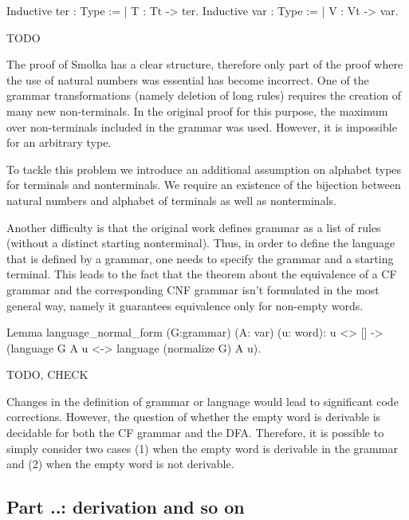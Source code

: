 \begin{listing}[h]
    \begin{pyglist}[language=coq, numbers=none, numbersep=5pt]
  Inductive ter : Type := | T : Tt -> ter.
  Inductive var : Type := | V : Vt -> var.
    \end{pyglist}
    \caption{TODO}
    \label{lst:verbments1}
\end{listing}

The proof of Smolka has a clear structure, therefore only part of the proof where the use of natural numbers was essential has become incorrect. One of the grammar transformations (namely deletion of long rules) requires the creation of many new non-terminals. In the original proof for this purpose, the maximum over non-terminals included in the grammar was used. However, it is impossible for an arbitrary type.

To tackle this problem we introduce an additional assumption on alphabet types for terminals and nonterminals. We require an existence of the bijection between natural numbers and alphabet of terminals as well as nonterminals.

Another difficulty is that the original work defines grammar as a list of rules (without a distinct starting nonterminal). Thus, in order to define the language that is defined by a  grammar, one needs to specify the grammar and a starting terminal. This leads to the fact that the theorem about the equivalence of a CF grammar and the corresponding CNF grammar isn't formulated in the most general way, namely it guarantees equivalence only for non-empty words. 

\begin{listing}[h]
    \begin{pyglist}[language=coq, numbers=none, numbersep=5pt]
  Lemma language_normal_form 
      (G:grammar) (A: var) (u: word):
    u <> [] -> 
    (language G A u <-> 
       language (normalize G) A u).
    \end{pyglist}
    \caption{TODO, CHECK}
    \label{lst:verbments1}
\end{listing}

Changes in the definition of grammar or language would lead to significant code corrections. However, the question of whether the empty word is derivable is decidable for both the CF grammar and the DFA. Therefore, it is possible to simply consider two cases (1) when the empty word is derivable in the grammar and (2) when the empty word is not derivable.

\subsection{Part ..: derivation and so on}


